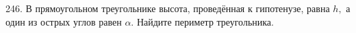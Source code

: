246. В прямоугольном треугольнике высота, проведённая к гипотенузе, равна $h,$ а один из острых
углов равен $\alpha.$ Найдите периметр треугольника.\\
